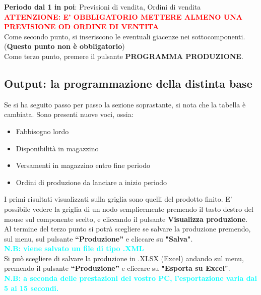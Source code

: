 \documentclass[12pt,twoside]{report}
\newcommand{\coloredbold}[2]{\textcolor{#1}{\textbf{#2}}}
\begin{document}
\textbf{Periodo dal 1 in poi}:
Previsioni di vendita,
Ordini di vendita\\

\coloredbold{red}{ATTENZIONE: E' OBBLIGATORIO METTERE ALMENO UNA PREVISIONE OD ORDINE DI VENTITA}\\

Come secondo punto, si inseriscono le eventuali giacenze nei sottocomponenti. (\textbf{Questo punto non è obbligatorio})\\

Come terzo punto, premere il pulsante \textbf{PROGRAMMA PRODUZIONE}.

\subsection{Output: la programmazione della distinta base}

Se si ha seguito passo per passo la sezione soprastante, si nota che la tabella è cambiata.
Sono presenti nuove voci, ossia:
\begin{itemize}
	
	\item Fabbisogno lordo
	\item Disponibilità in magazzino
	\item Versamenti in magazzino entro fine periodo 
	\item Ordini di produzione da lanciare a inizio periodo
	      
\end{itemize}

I primi risultati visualizzati sulla griglia sono quelli del prodotto finito. E' possibile vedere la griglia di un nodo semplicemente premendo il tasto destro del mouse sul componente scelto, e cliccando il pulsante \textbf{Visualizza produzione}.\\

Al termine del terzo punto si potrà scegliere se salvare la produzione premendo, sul menu, sul pulsante \textbf{“Produzione”} e cliccare su \textbf{"Salva"}. \\
\coloredbold{cyan}{N.B: viene salvato un file di tipo .XML}\\

Si può scegliere di salvare la produzione in .XLSX (Excel) andando sul menu, premendo il pulsante \textbf{“Produzione”} e cliccare su \textbf{"Esporta su Excel"}. \\
\coloredbold{cyan}{N.B: a seconda delle prestazioni del vostro PC, l'esportazione varia dai 5 ai 15 secondi.}\\
\end{document}
